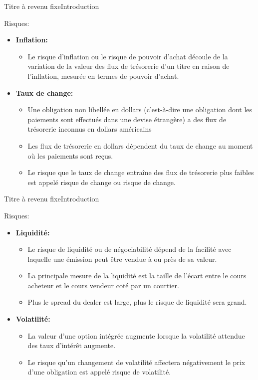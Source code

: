 \documentclass{beamer}
\begin{document}
\begin{frame}{Titre à revenu fixe}{Introduction}
\begin{block}{Risques:}
\begin{itemize}
\item \textbf{Inflation:} 
\begin{itemize}
\item Le risque d'inflation ou le risque de pouvoir d'achat découle de la variation de la valeur des flux de trésorerie d'un titre en raison de l'inflation, mesurée en termes de pouvoir d'achat.
\end{itemize}
\item \textbf{Taux de change:} 
\begin{itemize}
\item Une obligation non libellée en dollars (c'est-à-dire une obligation dont les paiements sont effectués dans une devise étrangère) a des flux de trésorerie inconnus en dollars américains
\item Les flux de trésorerie en dollars dépendent du taux de change au moment où les paiements sont reçus.
\item Le risque que le taux de change entraîne des flux de trésorerie plus faibles est appelé risque de change ou risque de change.
\end{itemize}
\end{itemize}
\end{block}

\end{frame}


\begin{frame}{Titre à revenu fixe}{Introduction}
\begin{block}{Risques:}
\begin{itemize}

\item \textbf{Liquidité:} 
\begin{itemize}
\item Le risque de liquidité ou de négociabilité dépend de la facilité avec laquelle une émission peut être vendue à ou près de sa valeur.
\item La principale mesure de la liquidité est la taille de l'écart entre le cours acheteur et le cours vendeur coté par un courtier.
\item Plus le spread du dealer est large, plus le risque de liquidité sera grand.
\end{itemize}
\item \textbf{Volatilité:}
\begin{itemize}
\item La valeur d'une option intégrée augmente lorsque la volatilité attendue des taux d'intérêt augmente.
\item Le risque
qu'un changement de volatilité affectera négativement le prix d'une obligation est appelé risque de volatilité.
\end{itemize}
\end{itemize}
\end{block}

\end{frame}
\end{document}
